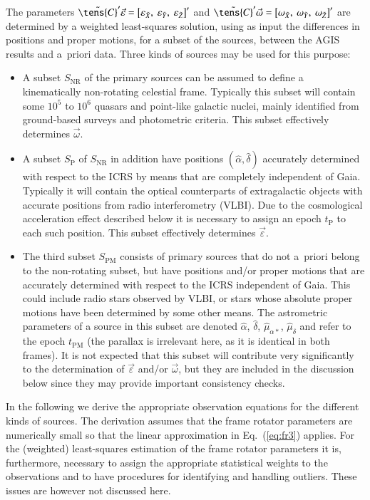 \documentclass[structabstract]{aa}
\begin{document}
The parameters $\tilde{\tens{C}}'\vec{\varepsilon}=\left[
\varepsilon_{\tilde{X}},~\varepsilon_{\tilde{Y}},~\varepsilon_{\tilde{Z}}\right]'$
and $\tilde{\tens{C}}'\vec{\omega}=\left[
\omega_{\tilde{X}},~\omega_{\tilde{Y}},~\omega_{\tilde{Z}}\right]'$
are determined by a weighted least-squares solution, using as input the 
differences in positions and proper motions, for a subset of the sources,
between the AGIS results and a~priori data. Three kinds of sources may be 
used for this purpose:
\begin{itemize}
\item
A subset $S_\text{NR}$ of the primary sources can be assumed to define a
kinematically non-rotating celestial frame. Typically this subset will contain 
some $10^5$ to $10^6$ quasars and point-like galactic nuclei, mainly 
identified from ground-based surveys and photometric criteria. This subset
effectively determines $\vec{\omega}$. 
\item 
A subset $S_\text{P}$ of $S_\text{NR}$ in addition have positions
$(\hat{\alpha},\hat{\delta})$ accurately determined with respect to the 
ICRS by means that are completely independent of Gaia. Typically it will 
contain the optical counterparts of extragalactic objects with accurate 
positions from radio interferometry (VLBI). Due to the cosmological
acceleration effect described below it is necessary to assign an epoch 
$t_\text{P}$ to each such position. This subset effectively determines 
$\vec{\varepsilon}$.
\item 
The third subset $S_\text{PM}$ consists of primary sources that do not
a~priori belong to the non-rotating subset, but have positions and/or 
proper motions that are accurately determined with respect to the ICRS 
independent of Gaia. This could include radio stars observed by VLBI,
or stars whose absolute proper motions have been determined by some
other means. The astrometric parameters of a source in this subset are denoted 
$\hat{\alpha}$, $\hat{\delta}$, $\hat{\mu}_{\alpha*}$, 
$\hat{\mu}_{\delta}$ and refer to the epoch $t_\text{PM}$ (the parallax is 
irrelevant here, as it is identical in both frames). It is not expected that this 
subset will contribute very significantly to the determination of $\vec{\varepsilon}$
and/or $\vec{\omega}$, but they are included in the discussion below 
since they may provide important consistency checks.
\end{itemize}
In the following we derive the appropriate observation equations for the
different kinds of sources. The derivation
assumes that the frame rotator parameters are numerically small so that
the linear approximation in Eq.~(\ref{eq:fr3}) applies. 
For the (weighted) least-squares estimation of the frame rotator parameters 
it is, furthermore, necessary to assign the appropriate statistical weights to 
the observations and to have procedures for identifying and handling outliers. 
These issues are however not discussed here. 
\end{document}
